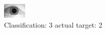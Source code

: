 \begin{figure}[h!]
\begin{center}
\includegraphics[width=0.60\columnwidth]{figures/ID1603_class_3_target_2.png}
\end{center}
\caption{ Classification: 3 actual target: 2}
\label{fig:ID1603_class_3_target_2}
\end{figure}
